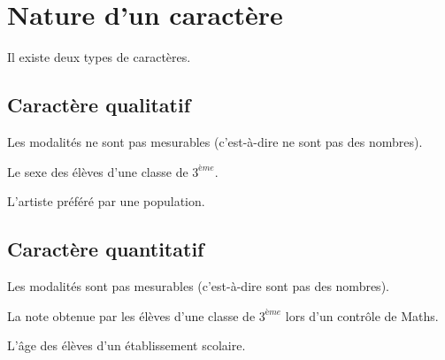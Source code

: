 \documentclass[12pt,a4paper]{report}
\begin{document}
\section{Nature d'un caractère}
Il existe deux types de caractères.
\subsection{Caractère qualitatif}
Les modalités ne sont pas mesurables (c'est-à-dire ne sont pas des nombres).

\begin{exemples}
\item Le sexe des élèves d'une classe de $3^{ème}$.
\item L'artiste préféré par une population.
\end{exemples}

\subsection{Caractère quantitatif}
Les modalités sont pas mesurables (c'est-à-dire sont pas des nombres).

\begin{exemples}
\item La note obtenue par les élèves d'une classe de $3^{ème}$ lors d'un contrôle de Maths.
\item L'âge des élèves d'un établissement scolaire.
\end{exemples}

\newpage
\newcommand{\A}{Almok}
\newcommand{\B}{TooFan}
\newcommand{\C}{Santrinos}
\newcommand{\D}{Etan}
\newcommand{\E}{Machin}
\end{document}
